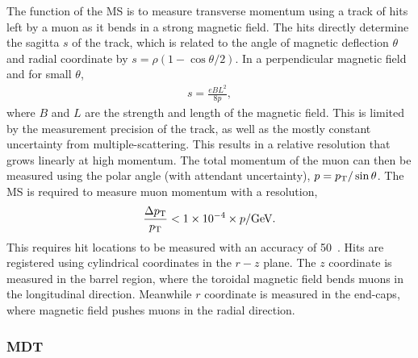 The function of the MS is to measure transverse momentum using a track of hits left by a muon as it bends in a strong magnetic field.
The hits directly determine the sagitta $s$ of the track, which is related to the angle of magnetic deflection $\theta$ and radial coordinate by $s=\rho(1-\cos\theta/2)$.
In a perpendicular magnetic field and for small $\theta$,
\begin{equation}\begin{split}
    s=\frac{eBL^2}{8p},
\end{split}\end{equation} 
where $B$ and $L$ are the strength and length of the magnetic field.
This is limited by the measurement precision of the track, as well as the mostly constant uncertainty from multiple-scattering.
This results in a relative resolution that grows linearly at high momentum.
The total momentum of the muon can then be measured using the polar angle (with attendant uncertainty), $p=p_\text{T}/\sin{\theta}$.
\cite{grupen}
The MS is required to measure muon momentum with a resolution,
\begin{equation}\begin{split}
    \frac{\Delta p_\text{T}}{p_\text{T}}<1\times10^{-4}\times p/\text{GeV}.
\end{split}\end{equation} 
This requires hit locations to be measured with an accuracy of 50~\um.
Hits are registered using cylindrical coordinates in the $r-z$ plane.
The $z$ coordinate is measured in the barrel region, where the toroidal magnetic field bends muons in the longitudinal direction.
Meanwhile $r$ coordinate is measured in the end-caps, where magnetic field pushes muons in the radial direction. 
\cite{muonTdr}

\subsubsection{MDT} %

